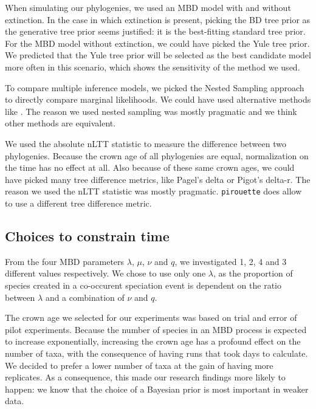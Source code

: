 When simulating our phylogenies, we used an MBD model with and without
extinction. In the case in which extinction is present,
picking the BD tree prior as the generative tree prior seems justified:
it is the best-fitting standard tree prior. For the MBD model without
extinction, we could have picked the Yule tree prior. 
We predicted that the Yule tree prior will be selected as the best candidate model
more often in this scenario, which shows the sensitivity of the method we used.

To compare multiple inference models, we picked the Nested Sampling
approach to directly compare marginal likelihoods. We could have used
alternative methods like . The reason we used nested
sampling was mostly pragmatic and we think other methods are equivalent.

We used the absolute nLTT statistic to measure the difference between
two phylogenies. Because the crown age of all phylogenies are equal,
normalization on the time has no effect at all. Also because of these
same crown ages, we could have picked many tree difference metrics, like
 Pagel's delta or Pigot's delta-r. The reason we used
the nLTT statistic was mostly pragmatic. \verb;pirouette; does allow to 
use a different tree difference metric.

\subsection{Choices to constrain time}

From the four MBD parameters $\lambda$, $\mu$, $\nu$ and $q$,
we investigated 1, 2, 4 and 3 different values respectively.
We chose to use only one $\lambda$, as the proportion of species
created in a co-occurent speciation event is dependent on the ratio
between $\lambda$ and a combination of $\nu$ and $q$.  

The crown age we selected for our experiments was based on trial and error
of pilot experiments. Because the number of species in an MBD process is
expected to increase exponentially, increasing the crown age has a
profound effect on the number of taxa, with the consequence of having
runs that took days to calculate. We decided to prefer a lower number of
taxa at the gain of having more replicates. As a consequence, 
this made our research findings 
 more likely to happen: we know that the
choice of a Bayesian prior is most important in weaker data. 

